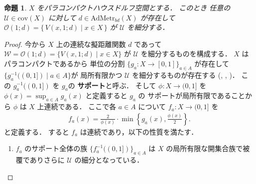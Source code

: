 \documentclass[leqno, a4paper, 12pt]{jsarticle}
\numberwithin{equation}{section}
\newtheorem{prop}[thm]{命題}
\newcommand{\yocov}[1]{\mathrm{cov}(#1)}
\newcommand{\yocovfont}[1]{\mathscr{#1}}
\newcommand{\yocbamet}[1]{\mathrm{AdMetr}_{bd}(#1)}
\newcommand{\yoball}[3]{V(#1, #2; #3)}
\newcommand{\yoballfam}[2]{\yocovfont{O}(#1; #2)}
\begin{document}
\begin{prop}\label{prop:covpmet}
$X$
をパラコンパクトハウスドルフ空間とする．
このとき
任意の
$\yocovfont{U}\in \yocov{X}$
に対して
$d\in \yocbamet{X}$
が存在して
$\yoballfam{1}{d}=\{\,\yoball{x}{1}{d}\mid x\in X\, \}$
が
$\yocovfont{U}$
を細分する．
\end{prop}
\begin{proof}
今から
$X$
上の連続な擬距離関数
$d$
であって
$\yocovfont{W}=\yoballfam{1}{d}=\{\yoball{x}{1}{d}\mid x\in X\}$
が
$\yocovfont{U}$
を細分するものを構成する．
$X$
はパラコンパクトであるから
単位の分割
$\{g_{a}\colon X\to [0, 1]\}_{a\in A}$
が存在して
$\{g_{a}^{-1}((0, 1])\mid a\in A\}$が
局所有限かつ
$\yocovfont{U}$
を細分するものが存在する
(\cite[系, p56]{bourbaki4}, 
\cite[定理7.44]{miyajima}
  \cite[Proposition 2]{MR0056905}, 
  \cite[Corollary 2.7.3]{MR3099433})．
この
$g_{a}^{-1}((0, 1])$
を
$g_{a}$の
\textbf{サポート}と呼ぶ．
そして
$\phi\colon X\to (0, 1]$
を
$\phi(x)=\sup_{a\in A}g_{a}(x)$
と定義すると
$g_{a}$
の
サポートが局所有限であることから
$\phi$
は
$X$
上連続である．
ここで各
$a\in A$
について
$f_{a}\colon X\to (0, 1]$
を
 \begin{align}
f_{a}(x)=\frac{2}{\phi(x)}\cdot \min
\left\{g_{a}(x), \frac{\phi(x)}{2}
\right\}. 
 \end{align}
 と定義する．
 すると
 $f_{a}$
 は連続であり，以下の性質を満たす．
 \begin{enumerate}[label=\textup{(A\arabic*)}]


\item\label{item:p1}
$f_{a}$
のサポート全体の族
$\{f_{a}^{-1}((0, 1])\}_{a\in A}$
は
$X$
の局所有限な開集合族で被覆でありさらに 
$\yocovfont{U}$
の細分となっている．


\end{enumerate}
\end{proof}
\end{document}
